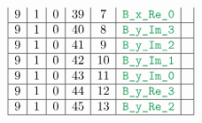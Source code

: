 \begin{figure}[h!]
\begin{adjustwidth}{-2cm}{-2cm}
{\[\begin{array}{|c|c|c|c|c|c|c|}
                    9                      & 1                                            & 0                                              & 39                     & 7                   & \locBXReZero         &                                                                                                                                                                       \\ \hline
                    9                      & 1                                            & 0                                              & 40                     & 8                   & \locBYImThree        &                                                                                                                                                                       \\ \hline
                    9                      & 1                                            & 0                                              & 41                     & 9                   & \locBYImTwo          &                                                                                                                                                                       \\ \hline
                    9                      & 1                                            & 0                                              & 42                     & 10                  & \locBYImOne          &                                                                                                                                                                       \\ \hline
                    9                      & 1                                            & 0                                              & 43                     & 11                  & \locBYImZero         &                                                                                                                                                                       \\ \hline
                    9                      & 1                                            & 0                                              & 44                     & 12                  & \locBYReThree        &                                                                                                                                                                       \\ \hline
                    9                      & 1                                            & 0                                              & 45                     & 13                  & \locBYReTwo          &                                                                                                                                                                       \\ \hline

\end{array}\]}
\end{adjustwidth}
\end{figure}
